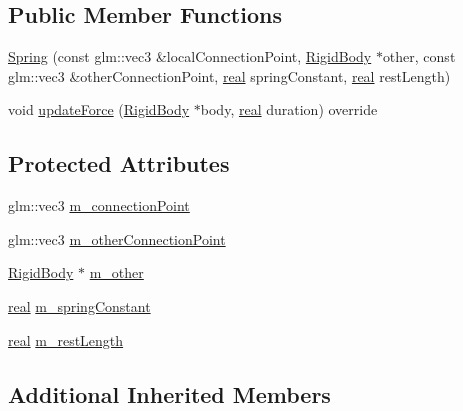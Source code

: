 \subsection*{Public Member Functions}
\begin{DoxyCompactItemize}
\item 
\mbox{\hyperlink{classr3_1_1_spring_ae96ec521b5609d2ace1476aec3c831f3}{Spring}} (const glm\+::vec3 \&local\+Connection\+Point, \mbox{\hyperlink{classr3_1_1_rigid_body}{Rigid\+Body}} $\ast$other, const glm\+::vec3 \&other\+Connection\+Point, \mbox{\hyperlink{namespacer3_ab2016b3e3f743fb735afce242f0dc1eb}{real}} spring\+Constant, \mbox{\hyperlink{namespacer3_ab2016b3e3f743fb735afce242f0dc1eb}{real}} rest\+Length)
\item 
void \mbox{\hyperlink{classr3_1_1_spring_a3305adfd568606ed9ae6fb589f20446b}{update\+Force}} (\mbox{\hyperlink{classr3_1_1_rigid_body}{Rigid\+Body}} $\ast$body, \mbox{\hyperlink{namespacer3_ab2016b3e3f743fb735afce242f0dc1eb}{real}} duration) override
\end{DoxyCompactItemize}
\subsection*{Protected Attributes}
\begin{DoxyCompactItemize}
\item 
glm\+::vec3 \mbox{\hyperlink{classr3_1_1_spring_a3c1e08e176ebc363b9f217875036955d}{m\+\_\+connection\+Point}}
\item 
glm\+::vec3 \mbox{\hyperlink{classr3_1_1_spring_a7a1c5a5c2960bbf756dac88986e939ae}{m\+\_\+other\+Connection\+Point}}
\item 
\mbox{\hyperlink{classr3_1_1_rigid_body}{Rigid\+Body}} $\ast$ \mbox{\hyperlink{classr3_1_1_spring_ac762f73af2e30d8f6f1e6b0a1575d49e}{m\+\_\+other}}
\item 
\mbox{\hyperlink{namespacer3_ab2016b3e3f743fb735afce242f0dc1eb}{real}} \mbox{\hyperlink{classr3_1_1_spring_a06963e33fd2c3f8e25ddd345324b292b}{m\+\_\+spring\+Constant}}
\item 
\mbox{\hyperlink{namespacer3_ab2016b3e3f743fb735afce242f0dc1eb}{real}} \mbox{\hyperlink{classr3_1_1_spring_ad1c8ba98c782bee7f9896d0c868b9ee7}{m\+\_\+rest\+Length}}
\end{DoxyCompactItemize}
\subsection*{Additional Inherited Members}



